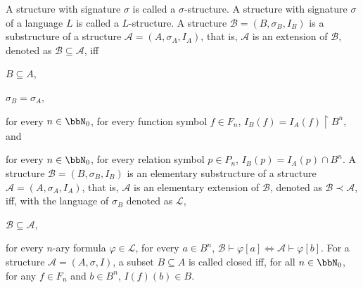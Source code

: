 \documentclass[a4paper,12pt]{article}
\begin{document}
A structure with signature $\sigma$ is called a $\sigma$-structure. A structure with signature $\sigma$ of a language $L$ is called a $L$-structure.
A structure $\mathcal{B}=(B,\sigma_B,I_B)$ is a substructure of a structure $\mathcal{A}=(A,\sigma_A,I_A)$, that is, $\mathcal{A}$ is an extension of $\mathcal{B}$, denoted as $\mathcal{B}\subseteq\mathcal{A}$, iff
\bit
\item $B\subseteq A$,
\item $\sigma_B=\sigma_A$,
\item for every $n\in\bbN_0$, for every function symbol $f\in F_n$, $I_B(f)=I_A(f)\upharpoonright B^n$, and
\item for every $n\in\bbN_0$, for every relation symbol $p\in P_n$, $I_B(p)=I_A(p)\cap B^n$.
\eit
{}
A structure $\mathcal{B}=(B,\sigma_B,I_B)$ is an elementary substructure of a structure $\mathcal{A}=(A,\sigma_A,I_A)$, that is, $\mathcal{A}$ is an elementary extension of $\mathcal{B}$, denoted as $\mathcal{B}\prec\mathcal{A}$, iff, with the language of $\sigma_B$ denoted as $\mathcal{L}$,
\bit
\item $\mathcal{B}\subseteq\mathcal{A}$,
\item for every $n$-ary formula $\varphi\in\mathcal{L}$, for every $a\in B^n$, $\mathcal{B}\vdash\varphi[a]\iff\mathcal{A}\vdash\varphi[b]$.
\eit
{}
For a structure $\mathcal{A}=(A,\sigma,I)$, a subset $B\subseteq A$ is called closed iff, for all $n\in\bbN_0$, for any $f\in F_n$ and $b\in B^n$, $I(f)(b)\in B$.
\end{document}
